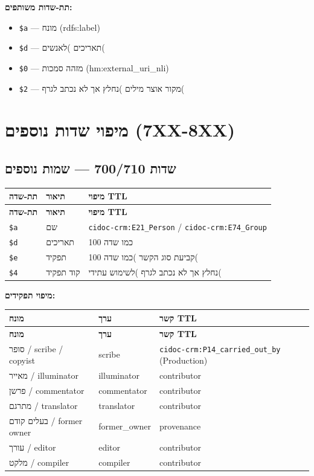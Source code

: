 \documentclass[12pt,a4paper]{article}
\newcommand{\marcfield}[1]{\texttt{#1}}
\newcommand{\ttlprop}[1]{\texttt{#1}}
\newcommand{\ttlclass}[1]{\texttt{#1}}
\begin{document}
\textbf{תת-שדות משותפים:}
\begin{itemize}
\item \marcfield{\$a} — מונח \textenglish{(rdfs:label)}
\item \marcfield{\$d} — תאריכים )לאנשים(
\item \marcfield{\$0} — מזהה סמכות \textenglish{(hm:external\_uri\_nli)}
\item \marcfield{\$2} — מקור אוצר מילים )נחלץ אך לא נכתב לגרף(
\end{itemize}

\newpage
\section{מיפוי שדות נוספים \textenglish{(7XX-8XX)}}

\subsection{שדות 700/710 — שמות נוספים}

\begin{longtable}{|L{2.5cm}|p{4.5cm}|L{9cm}|}
\hline
\textbf{תת-שדה} & \textbf{תיאור} & \textbf{מיפוי TTL} \\
\hline
\endfirsthead
\hline
\textbf{תת-שדה} & \textbf{תיאור} & \textbf{מיפוי TTL} \\
\hline
\endhead
\hline
\endfoot
\marcfield{\$a} & שם & \ttlclass{cidoc-crm:E21\_Person} / \ttlclass{cidoc-crm:E74\_Group} \\
\hline
\marcfield{\$d} & תאריכים & כמו שדה 100 \\
\hline
\marcfield{\$e} & תפקיד & קביעת סוג הקשר )כמו שדה 100( \\
\hline
\marcfield{\$4} & קוד תפקיד & נחלץ אך לא נכתב לגרף )לשימוש עתידי( \\
\hline
\end{longtable}

\textbf{מיפוי תפקידים:}

\begin{longtable}{|p{4cm}|L{5cm}|L{7cm}|}
\hline
\textbf{מונח} & \textbf{ערך} & \textbf{קשר TTL} \\
\hline
\endfirsthead
\hline
\textbf{מונח} & \textbf{ערך} & \textbf{קשר TTL} \\
\hline
\endhead
\hline
\endfoot
סופר / scribe / copyist & scribe & \ttlprop{cidoc-crm:P14\_carried\_out\_by} \textenglish{(Production)} \\
\hline
מאייר / illuminator & illuminator & contributor \\
\hline
פרשן / commentator & commentator & contributor \\
\hline
מתרגם / translator & translator & contributor \\
\hline
בעלים קודם / former owner & former\_owner & provenance \\
\hline
עורך / editor & editor & contributor \\
\hline
מלקט / compiler & compiler & contributor \\
\hline
\end{longtable}
\end{document}
